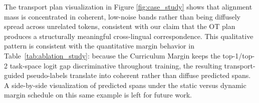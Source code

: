 \documentclass[11pt]{article}
\begin{document}
The transport plan visualization in Figure \ref{fig:case_study} shows that alignment mass is concentrated in coherent, low-noise bands rather than being diffusely spread across unrelated tokens, consistent with our claim that the OT plan produces a structurally meaningful cross-lingual correspondence. This qualitative pattern is consistent with the quantitative margin behavior in Table~\ref{tab:ablation_study}: because the Curriculum Margin keeps the top-1/top-2 task-space logit gap discriminative throughout training, the resulting transport-guided pseudo-labels translate into coherent rather than diffuse predicted spans. A side-by-side visualization of predicted spans under the static versus dynamic margin schedule on this same example is left for future work.
\end{document}
